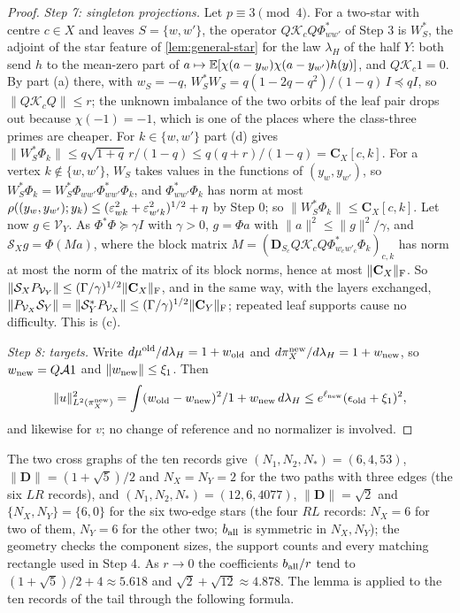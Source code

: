 \begin{proof}
\emph{Step 7: singleton projections.} Let $p\equiv3\pmod4$. For a two-star with
centre $c\in X$ and leaves $S=\{w,w'\}$, the operator $Q\mathcal K_cQ\Phi^*_{ww'}$ of
Step 3 is $W_S^*$, the adjoint of the star feature of \cref{lem:general-star} for
the law $\lambda_H$ of the half $Y$: both send $h$ to the mean-zero part of
$a\mapsto\E[\chi(a-y_w)\chi(a-y_{w'})h(y)]$, and $Q\mathcal K_c1=0$. By part (a)
there, with $w_S=-q$, $W_S^*W_S=q(1-2q-q^2)/(1-q)\,I\preceq qI$, so
$\|Q\mathcal K_cQ\|\le r$; the unknown imbalance of the two orbits of the leaf pair
drops out because $\chi(-1)=-1$, which is one of the places where the class-three
primes are cheaper. For $k\in\{w,w'\}$ part (d) gives
$\|W_S^*\Phi_k\|\le q\sqrt{1+q}\,r/(1-q)\le q(q+r)/(1-q)=\mathbf C_X[c,k]$. For a
vertex $k\notin\{w,w'\}$, $W_S$ takes values in the functions of $(y_w,y_{w'})$, so
$W_S^*\Phi_k=W_S^*\Phi_{ww'}\Phi^*_{ww'}\Phi_k$, and $\Phi^*_{ww'}\Phi_k$ has norm at
most $\rho((y_w,y_{w'});y_k)\le(\eps_{wk}^2+\eps_{w'k}^2)^{1/2}+\eta$ by Step 0; so
$\|W_S^*\Phi_k\|\le\mathbf C_X[c,k]$. Let now $g\in\mathcal V_Y$. As $\Phi^*\Phi\succeq\gamma I$ with
$\gamma>0$, $g=\Phi a$ with $\|a\|^2\le\|g\|^2/\gamma$, and $\mathcal S_Xg=\Phi(Ma)$,
where the block matrix
$M=(\mathbf D_{S_c}Q\mathcal K_cQ\Phi^*_{w_cw'_c}\Phi_k)_{c,k}$ has norm at most the
norm of the matrix of its block norms, hence at most $\|\mathbf C_X\|_{\rm F}$. So
$\|\mathcal S_XP_{\mathcal V_Y}\|\le(\Gamma/\gamma)^{1/2}\|\mathbf C_X\|_{\rm F}$,
and in the same way, with the layers exchanged,
$\|P_{\mathcal V_X}\mathcal S_Y\|=\|\mathcal S_Y^*P_{\mathcal V_X}\|\le
(\Gamma/\gamma)^{1/2}\|\mathbf C_Y\|_{\rm F}$; repeated leaf supports cause no
difficulty. This is (c).

\emph{Step 8: targets.} Write $d\mu^{\rm old}/d\lambda_H=1+w_{\rm old}$ and
$d\pi^{\rm new}_X/d\lambda_H=1+w_{\rm new}$, so $w_{\rm new}=Q\mathcal A1$ and
$\|w_{\rm new}\|\le\xi_1$. Then
\[
 \|u\|^2_{L^2(\pi^{\rm new}_X)}=\int\frac{(w_{\rm old}-w_{\rm new})^2}
 {1+w_{\rm new}}\,d\lambda_H\le e^{\ell_{\rm new}}(\epsilon_{\rm old}+\xi_1)^2,
\]
and likewise for $v$; no change of reference and no normalizer is involved.
\end{proof}

The two cross graphs of the ten records give $(N_1,N_2,N_*)=(6,4,53)$,
$\|\mathbf D\|=(1+\sqrt5)/2$ and $N_X=N_Y=2$ for the two paths with three edges
(the six $LR$ records), and $(N_1,N_2,N_*)=(12,6,4077)$, $\|\mathbf D\|=\sqrt2$
and $\{N_X,N_Y\}=\{6,0\}$ for the six two-edge stars (the four $RL$ records:
$N_X=6$ for two of them, $N_Y=6$ for the other two; $b_{\rm all}$ is symmetric
in $N_X,N_Y$); the geometry checks the component sizes, the support counts and
every matching rectangle used in Step 4. As $r\to0$ the coefficients
$b_{\rm all}/r$ tend to $(1+\sqrt5)/2+4\approx5.618$ and
$\sqrt2+\sqrt{12}\approx4.878$. The lemma is applied to the ten records of the
tail through the following formula.

